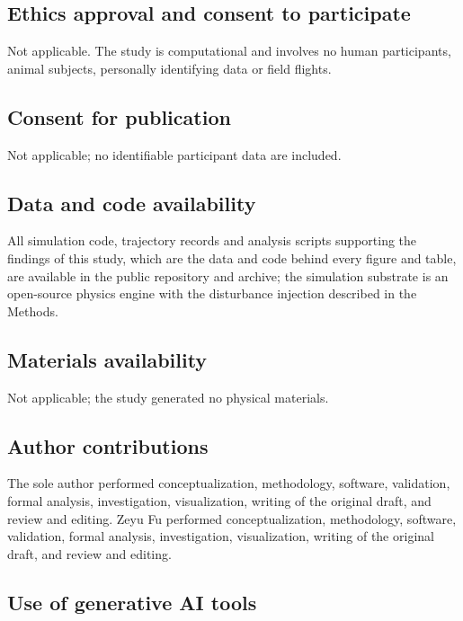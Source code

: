 \subsection*{Ethics approval and consent to participate}

Not applicable. The study is computational and involves no human
participants, animal subjects, personally identifying data or field flights.

\subsection*{Consent for publication}

Not applicable; no identifiable participant data are included.

\subsection*{Data and code availability}

All simulation code, trajectory records and analysis scripts supporting the
findings of this study, which are the data and code behind every figure and
table, are available in the public repository and archive; the simulation
substrate is an open-source physics engine with the disturbance injection
described in the Methods.


\subsection*{Materials availability}

Not applicable; the study generated no physical materials.

\subsection*{Author contributions}

\ifdefined\ANONYMOUS
The sole author performed conceptualization, methodology, software,
validation, formal analysis, investigation, visualization, writing of the
original draft, and review and editing.
\else
Zeyu Fu performed conceptualization, methodology, software, validation,
formal analysis, investigation, visualization, writing of the original draft,
and review and editing.
\fi

\subsection*{Use of generative AI tools}


